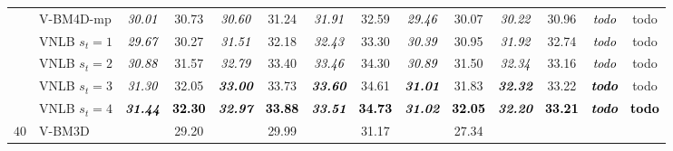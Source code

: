 \documentclass[10pt, journal, twocolumn, final, a4paper]{IEEEtran}
\newcommand{\best}[1]{#1}
\newcommand{\bsic}[1]{\textcolor{black}{\textit{#1}}}
\newcommand{\Bsic}[1]{\textcolor{black}{\textbf{\textit{#1}}}}
\newcommand{\Best}[1]{\textbf{\textcolor{black}{#1}}}
\begin{document}
\begin{table}[htp!]
\begin{center}
{\begin{tabular}{ c | l |c c | c c | c c | c c | c c | c c}
			                      & V-BM4D-mp            & \bsic{30.01} &       30.73  & \bsic{30.60} &       31.24  & \bsic{31.91} &       32.59  & \bsic{29.46} &       30.07  & \bsic{30.22} &       30.96  & \bsic{todo } &       todo   \\
			                      & VNLB   $s_t = 1$     & \bsic{29.67} &       30.27  & \bsic{31.51} &       32.18  & \bsic{32.43} &       33.30  & \bsic{30.39} &       30.95  & \bsic{31.92} &       32.74  & \bsic{todo } &       todo   \\
			                      & VNLB   $s_t = 2$     & \bsic{30.88} &       31.57  & \bsic{32.79} &       33.40  & \bsic{33.46} &       34.30  & \bsic{30.89} &       31.50  & \bsic{32.34} &       33.16  & \bsic{todo } &       todo   \\
			                      & VNLB   $s_t = 3$     & \bsic{31.30} &       32.05  & \Bsic{33.00} &       33.73  & \Bsic{33.60} &       34.61  & \Bsic{31.01} &       31.83  & \Bsic{32.32} &       33.22  & \Bsic{todo } &       todo   \\
			                      & VNLB   $s_t = 4$     & \Bsic{31.44} & \Best{32.30} & \Bsic{32.97} & \Best{33.88} & \Bsic{33.51} & \Best{34.73} & \Bsic{31.02} & \Best{32.05} & \Bsic{32.20} & \Best{33.21} & \Bsic{todo } & \Best{todo } \\\hline
%                                                                                                                                                                                                                                         
			\multirow{1}{*}{$40$}
			                      & V-BM3D               & \bsic{     } &       29.20  & \bsic{     } & \best{29.99} & \bsic{     } &       31.17  & \bsic{     } &       27.34  & \bsic{     } &              & \bsic{     } &              \\

\end{tabular}}
\end{center}
\end{table}
\end{document}
